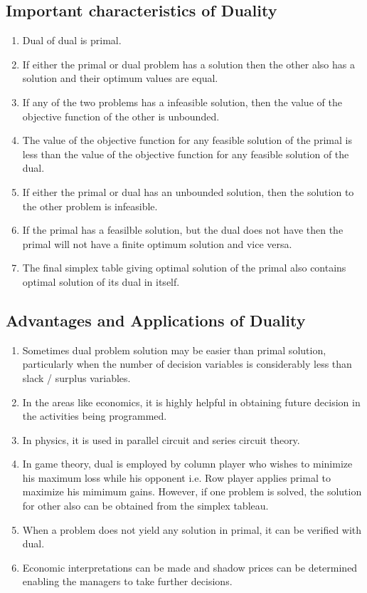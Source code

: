 \subsection{Important characteristics of Duality}
\begin{enumerate}
    \item Dual of dual is primal.
    \item If either the primal or dual problem has a solution then the
        other also has a solution and their optimum values are equal.
    \item If any of the two problems has a infeasible solution, then the
        value of the objective function of the other is unbounded.
    \item The value of the objective function for any feasible solution
        of the primal is less than the value of the objective function
        for any feasible solution of the dual.
    \item If either the primal or dual has an unbounded solution, then
        the solution to the other problem is infeasible.
    \item If the primal has a feasilble solution, but the dual does not
        have then the primal will not have a finite optimum solution and
        vice versa.
    \item The final simplex table giving optimal solution of the primal
        also contains optimal solution of its dual in itself.
\end{enumerate}

\subsection{Advantages and Applications of Duality}
\begin{enumerate}
    \item Sometimes dual problem solution may be easier than primal
        solution, particularly when the number of decision variables is
        considerably less than slack / surplus variables.
    \item In the areas like economics, it is highly helpful in obtaining
        future decision in the activities being programmed.
    \item In physics, it is used in parallel circuit and series circuit
        theory.
    \item In game theory, dual is employed by column player who wishes
        to minimize his maximum loss while his opponent i.e. Row player
        applies primal to maximize his mimimum gains. However, if one
        problem is solved, the solution for other also can be obtained
        from the simplex tableau.
    \item When a problem does not yield any solution in primal, it can
        be verified with dual.
    \item Economic interpretations can be made and shadow prices can be
        determined enabling the managers to take further decisions.
\end{enumerate}

